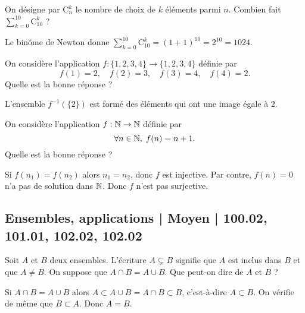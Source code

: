 \begin{question}
On désigne par $\mathrm{C}^k_n$ le nombre de choix de $k$ éléments parmi $n$. Combien fait $\displaystyle \sum _{k=0}^{10}\mathrm{C}^k_{10}$ ?
\begin{answers}  
\end{answers}
\begin{explanations}
Le binôme de Newton donne $\displaystyle \sum _{k=0}^{10}\mathrm{C}^k_{10}=(1+1)^{10}=2^{10}=1024$.
\end{explanations}
\end{question}


\begin{question}
On considère l'application $f:\{1,2,3,4\}\to \{1,2,3,4\}$ définie par
$$f(1)=2,\quad f(2)=3,\quad f(3)=4,\quad f(4)=2.$$
Quelle est la bonne réponse ?
\begin{answers}  
\end{answers}
\begin{explanations}
L'ensemble $f^{-1}(\{2\})$ est formé des éléments qui ont une image égale à $2$.
\end{explanations}
\end{question}


\begin{question}
On considère l'application $f:\mathbb{N}\to \mathbb{N}$ définie par
$$\forall n\in \mathbb{N},\; f(n)=n+1.$$
Quelle est la bonne réponse ?
\begin{answers}  
\end{answers}
\begin{explanations}
Si $f(n_1)=f(n_2)$ alors $n_1=n_2$, donc $f$ est injective. Par contre, $f(n)=0$ n'a pas de solution dans $\mathbb{N}$. Donc $f$ n'est pas surjective.
\end{explanations}
\end{question}


\subsection{Ensembles, applications | Moyen | 100.02, 101.01, 102.02, 102.02}


\begin{question}
Soit $A$ et $B$ deux ensembles. L'écriture $A\varsubsetneq B$ signifie que $A$ est inclus dans $B$ et que $A\neq B$. On suppose que $A\cap B=A\cup B$. Que peut-on dire de $A$ et $B$ ?
\begin{answers}  
\end{answers}
\begin{explanations}
Si $A\cap B=A\cup B$ alors $A\subset A\cup B=A \cap B\subset B$, c'est-à-dire $A\subset B$. On vérifie de même que $B\subset A$. Donc $A=B$.
\end{explanations}
\end{question}



